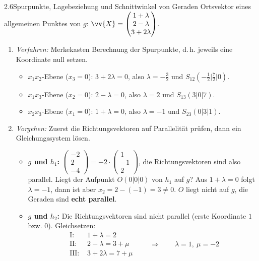 
\begin{loesung}{2.6}{Spurpunkte, Lagebeziehung und Schnittwinkel von Geraden}
Ortsvektor eines allgemeinen Punktes von $g$: $\vv{X} = \begin{pmatrix} 1+\lambda\\ 2-\lambda\\ 3+2\lambda\end{pmatrix}$.
\begin{enumerate}[label=\alph*)]
  \item \textit{Verfahren:} Merkekasten \glqq Berechnung der Spurpunkte\grqq, d.\,h. jeweils eine Koordinate null setzen.
  \begin{itemize}
    \item $x_1x_2$-Ebene ($x_3=0$): $3+2\lambda = 0$, also $\lambda = -\frac{3}{2}$ und $S_{12}\left(-\frac{1}{2}\big|\frac{7}{2}\big|0\right)$.
    \item $x_1x_3$-Ebene ($x_2=0$): $2-\lambda = 0$, also $\lambda = 2$ und $S_{13}(3|0|7)$.
    \item $x_2x_3$-Ebene ($x_1=0$): $1+\lambda = 0$, also $\lambda = -1$ und $S_{23}(0|3|1)$.
  \end{itemize}
  \item \textit{Vorgehen:} Zuerst die Richtungsvektoren auf Parallelität prüfen, dann ein Gleichungssystem lösen.
  \begin{itemize}
    \item \textbf{$g$ und $h_1$:} $\begin{pmatrix} -2\\ 2\\ -4\end{pmatrix} = -2\cdot\begin{pmatrix} 1\\ -1\\ 2\end{pmatrix}$, die Richtungsvektoren sind also parallel. Liegt der Aufpunkt $O(0|0|0)$ von $h_1$ auf $g$? Aus $1+\lambda = 0$ folgt $\lambda = -1$, dann ist aber $x_2 = 2-(-1) = 3\neq 0$. $O$ liegt nicht auf $g$, die Geraden sind \textbf{echt parallel}.
    \item \textbf{$g$ und $h_2$:} Die Richtungsvektoren sind nicht parallel (erste Koordinate $1$ bzw. $0$). Gleichsetzen:
    \[\begin{aligned} \text{I: }& 1+\lambda = 2\\ \text{II: }& 2-\lambda = 3+\mu\\ \text{III: }& 3+2\lambda = 7+\mu\end{aligned}\qquad\Longrightarrow\qquad \lambda = 1,\ \mu = -2\]

\end{itemize}
\end{enumerate}
\end{loesung}
